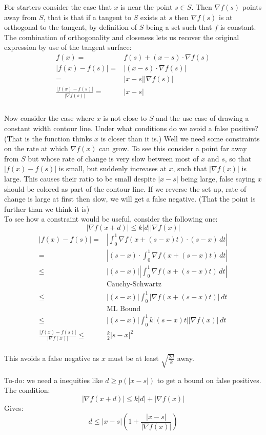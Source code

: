 For starters consider the case that $x$ is near the point $s \in S$.
Then $\nabla f(s)$ points away from $S$, that is that if a tangent to $S$ exists at $s$ then $\nabla f(s)$ is at orthogonal to the tangent, by definition of $S$ being a set such that $f$ is constant.
The combination of orthogonality and closeness lets us recover the original expression by use of the tangent surface:
\begin{equation*}
\begin{aligned}
	f(x) =& f(s)+(x-s)\cdot \nabla f(s) \\
	|f(x)-f(s)| =& |(x-s) \cdot \nabla f(s) |\\
	=& |x-s||\nabla f(s)| \\
	\frac{|f(x)-f(s)|}{|\nabla f(s) |} =& |x-s| \\
\end{aligned}
\end{equation*}
\\

Now consider the case where $x$ is not close to $S$ and the use case of drawing a constant width contour line.
Under what conditions do we avoid a false positive?
(That is the function thinks $x$ is closer than it is.)
Well we need some constraints on the rate at which $\nabla f(x)$ can grow.
To see this consider a point far away from $S$ but whose rate of change is very slow between most of $x$ and $s$, so that $|f(x) - f(s)|$ is small, but suddenly increases at $x$, such that $|\nabla f(x)|$ is large.
This causes their ratio to be small despite $|x-s|$ being large, false saying $x$ should be colored as part of the contour line.
If we reverse the set up, rate of change is large at first then slow, we will get a false negative.
(That the point is further than we think it is) 
\\

To see how a constraint would be useful, consider the following one: 
\[ |\nabla f(x+d)| \leq k|d||\nabla f(x)|\]
\begin{equation*}
\begin{aligned}
	|f(x)-f(s)| =& \left|\int_{0}^{1}\nabla f(x + (s-x)t) \cdot (s-x) \,dt\right| \\
	=& \left|(s-x)\cdot\int_{0}^{1}\nabla f(x + (s-x)t) \,dt\right| \\
	\leq& |(s-x)|\left|\int_{0}^{1}\nabla f(x + (s-x)t) \,dt\right| \\
	&\text{Cauchy-Schwartz} \\
	\leq& |(s-x)|\int_{0}^{1}\left|\nabla f(x + (s-x)t) \right|\,dt \\
	&\text{ML Bound} \\
	\leq& |(s-x)|\int_{0}^{1}k|(s-x)t||\nabla f(x)|\,dt \\
	\frac{|f(x)-f(s)|}{|\nabla f(x)|} \leq& \frac{k}{2}|s-x|^2 \\
\end{aligned}
\end{equation*}

This avoids a false negative as $x$ must be at least $ \sqrt{\frac{2d}{k}}$ away.

To-do: we need a inequities like $d \geq p(|x-s|)$ to get a bound on false positives.
\\
The condition:
\[ |\nabla f(x+d)| \leq k|d|+|\nabla f(x)|\]
Gives:
\[d \leq |x-s|\left(1+\frac{|x-s|}{|\nabla f(x)|}\right)\]
